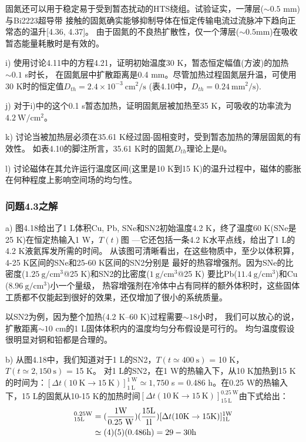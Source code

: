 固氮还可以用于稳定易于受到暂态扰动的HTS绕组。试验证实，一薄层($\sim 0.5$ mm)与Bi2223超导带
接触的固氮确实能够抑制导体在恒定传输电流过流脉冲下趋向正常态的温升[4.36, 4.37]。
由于固氮的不良热扩散性，仅一个薄层($\sim 0.5$mm)在吸收暂态能量耗散时是有效的。

i) 使用讨论4.11中的方程4.21，证明初始温度30 K，暂态恒定幅值(方波)的加热$\sim 0.1$ s时长，
在固氮层中扩散距离是0.4 mm。尽管加热过程固氮层升温，可使用30 K时的恒定值$D_{th}=2.4×10^{−3}\ \mathrm{cm^2/s}$ (表4.10中，$D_{th}=0.24\ \mathrm{mm^2/s}$).


j) 对于i)中的这个0.1 s暂态加热，证明固氮层被加热至35 K，可吸收的功率流为$4.2\ \mathrm{W/cm^2}$。

k) 讨论当被加热层必须在35.61 K经过固-固相变时，受到暂态加热的薄层固氮的有效性。
如表4.10的脚注所言，35.61 K时的固氮$D_{th}$理论上是0。

l) 讨论磁体在其允许运行温度区间(这里是10 K到15 K)的温升过程中，磁体的膨胀在何种程度上影响空间场的均匀性。

\subsubsection{问题4.3之解}
a) 图4.18给出了1 L体积Cu, Pb, SNe和SN2初始温度4.2 K，终了温度60 K(SNe是25 K)在恒定热输入1 W，$T(t)$图
---它还包括一条4.2 K水平点线，给出了1 L的4.2 K液氦挥发所需的时间。
从该图可清晰看出，在这些物质中，至少以体积算，4-25 K区间的SNe和25-60 K区间的SN2分别是
最好的热容增强剂。因为SNe的比密度($1.25\ \mathrm{g/cm^3}$@25 K)和SN2的比密度($1\ \mathrm{g/cm^3}$@25 K)
要比Pb($11.4\ \mathrm{g/cm^3}$)和Cu ($8.96\ \mathrm{g/cm^3}$)小一个量级，
热容增强剂在冷体中占有同样的额外体积时，这些固体工质都不仅能起到很好的效果，还仅增加了很小的系统质量。

以SN2为例，因为整个加热(4.2 K–60 K)过程需要$\sim 18$小时，
我们可以放心的说，扩散距离$\sim 10$ cm的1 L固体体积内的温度均匀分布假设是可行的。
均匀温度假设很明显对铜和铅都是合理的。

b) 从图4.18中，我们知道对于1 L的SN2，$T(t\simeq 400\ \mathrm{s})$ = 10 K，$T(t\simeq 2,150\ \mathrm{s})$ = 15 K。
对1 L的SN2，在1 W的热输入下，从10 K加热到15 K的时间为：$[\Delta t(10 \ \mathrm{K}\rightarrow 15\ \mathrm{K})]_{1\ \mathrm{L}}^{1\ \mathrm{W}}\simeq 1,750$ s = 0.486 h。在0.25 W的热输入下，15 L的固氮从10-15 K的加热时间$[\Delta t(10 \ \mathrm{K}\rightarrow 15 \ \mathrm{K})]_{15 \ \mathrm{L}}^{0.25\ \mathrm{W}}$由下式给出：
\begin{align*}%
[\Delta t(10\mathrm{K}\rightarrow 15\ \mathrm{K})]_{15\mathrm{L}}^{0.25\mathrm{W}}&=(\frac{1\mathrm{W}}{0.25\ \mathrm{W}})(\frac{15\mathrm{L}}{1\mathrm{l}})[\Delta t(10\mathrm{K}\rightarrow 15\mathrm{K})]_{1\mathrm{L}}^{1\mathrm{W}}\\\notag
&\simeq (4)(5)(0.486\mathrm{h})=29-30\mathrm{h}
\end{align*}

